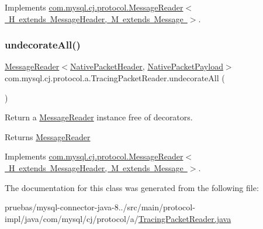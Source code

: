Implements \mbox{\hyperlink{interfacecom_1_1mysql_1_1cj_1_1protocol_1_1_message_reader_a59b0e118857c167ad4a270845f19e89b}{com.\+mysql.\+cj.\+protocol.\+Message\+Reader$<$ H extends Message\+Header, M extends Message $>$}}.

\mbox{\label{classcom_1_1mysql_1_1cj_1_1protocol_1_1a_1_1_tracing_packet_reader_a92981daf5c4331ba841e31d90d6b43ed}} 
\subsubsection{\texorpdfstring{undecorate\+All()}{undecorateAll()}}
{\footnotesize\ttfamily \mbox{\hyperlink{interfacecom_1_1mysql_1_1cj_1_1protocol_1_1_message_reader}{Message\+Reader}}$<$\mbox{\hyperlink{classcom_1_1mysql_1_1cj_1_1protocol_1_1a_1_1_native_packet_header}{Native\+Packet\+Header}}, \mbox{\hyperlink{classcom_1_1mysql_1_1cj_1_1protocol_1_1a_1_1_native_packet_payload}{Native\+Packet\+Payload}}$>$ com.\+mysql.\+cj.\+protocol.\+a.\+Tracing\+Packet\+Reader.\+undecorate\+All (\begin{DoxyParamCaption}{ }\end{DoxyParamCaption})}

Return a \mbox{\hyperlink{interfacecom_1_1mysql_1_1cj_1_1protocol_1_1_message_reader}{Message\+Reader}} instance free of decorators.

\begin{DoxyReturn}{Returns}
\mbox{\hyperlink{interfacecom_1_1mysql_1_1cj_1_1protocol_1_1_message_reader}{Message\+Reader}} 
\end{DoxyReturn}


Implements \mbox{\hyperlink{interfacecom_1_1mysql_1_1cj_1_1protocol_1_1_message_reader_a22a326215a91e4d7bff08d1f2c3e1b6d}{com.\+mysql.\+cj.\+protocol.\+Message\+Reader$<$ H extends Message\+Header, M extends Message $>$}}.



The documentation for this class was generated from the following file\+:\begin{DoxyCompactItemize}
\item 
pruebas/mysql-\/connector-\/java-\/8../src/main/protocol-\/impl/java/com/mysql/cj/protocol/a/\mbox{\hyperlink{_tracing_packet_reader_8java}{Tracing\+Packet\+Reader.\+java}}\end{DoxyCompactItemize}
